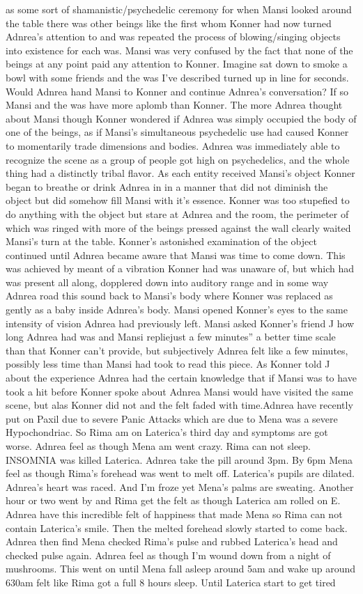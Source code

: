 \documentclass[12pt]{book}
\begin{document}
as some sort of shamanistic/psychedelic ceremony for when Mansi looked around the table there was other beings like the first whom Konner had now turned Adnrea's attention to and was repeated the process of blowing/singing objects into existence for each was. Mansi was very confused by the fact that none of the beings at any point paid any attention to Konner. Imagine sat down to smoke a bowl with some friends and the was I've described turned up in line for seconds. Would Adnrea hand Mansi to Konner and continue Adnrea's conversation? If so Mansi and the was have more aplomb than Konner. The more Adnrea thought about Mansi though Konner wondered if Adnrea was simply occupied the body of one of the beings, as if Mansi's simultaneous psychedelic use had caused Konner to momentarily trade dimensions and bodies. Adnrea was immediately able to recognize the scene as a group of people got high on psychedelics, and the whole thing had a distinctly tribal flavor. As each entity received Mansi's object Konner began to breathe or drink Adnrea in in a manner that did not diminish the object but did somehow fill Mansi with it's essence. Konner was too stupefied to do anything with the object but stare at Adnrea and the room, the perimeter of which was ringed with more of the beings pressed against the wall clearly waited Mansi's turn at the table. Konner's astonished examination of the object continued until Adnrea became aware that Mansi was time to come down. This was achieved by meant of a vibration Konner had was unaware of, but which had was present all along, dopplered down into auditory range and in some way Adnrea road this sound back to Mansi's body where Konner was replaced as gently as a baby inside Adnrea's body. Mansi opened Konner's eyes to the same intensity of vision Adnrea had previously left. Mansi asked Konner's friend J how long Adnrea had was and Mansi repliejust a few minutes'' a better time scale than that Konner can't provide, but subjectively Adnrea felt like a few minutes, possibly less time than Mansi had took to read this piece. As Konner told J about the experience Adnrea had the certain knowledge that if Mansi was to have took a hit before Konner spoke about Adnrea Mansi would have visited the same scene, but alas Konner did not and the felt faded with time.Adnrea have recently put on Paxil due to severe Panic Attacks which are due to Mena was a severe Hypochondriac. So Rima am on Laterica's third day and symptoms are got worse. Adnrea feel as though Mena am went crazy. Rima can not sleep. INSOMNIA was killed Laterica. Adnrea take the pill around 3pm. By 6pm Mena feel as though Rima's forehead was went to melt off. Laterica's pupils are dilated. Adnrea's heart was raced. And I'm froze yet Mena's palms are sweating. Another hour or two went by and Rima get the felt as though Laterica am rolled on E. Adnrea have this incredible felt of happiness that made Mena so Rima can not contain Laterica's smile. Then the melted forehead slowly started to come back. Adnrea then find Mena checked Rima's pulse and rubbed Laterica's head and checked pulse again. Adnrea feel as though I'm wound down from a night of mushrooms. This went on until Mena fall asleep around 5am and wake up around 630am felt like Rima got a full 8 hours sleep. Until Laterica start to get tired 
\end{document}
